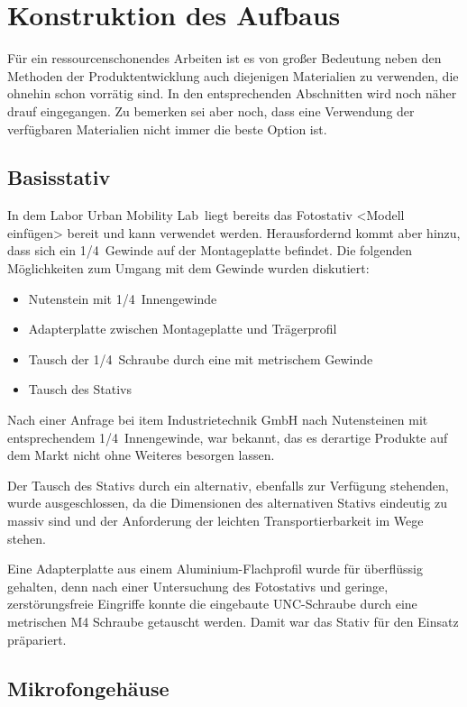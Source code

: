 \section{Konstruktion des Aufbaus}

Für ein ressourcenschonendes Arbeiten ist es von großer Bedeutung neben den Methoden der Produktentwicklung auch diejenigen Materialien zu verwenden, die ohnehin schon vorrätig sind. In den entsprechenden Abschnitten wird noch näher drauf eingegangen. Zu bemerken sei aber noch, dass eine Verwendung der verfügbaren Materialien nicht immer die beste Option ist.

\subsection{Basisstativ}

In dem Labor \glqq Urban Mobility Lab\grqq\ liegt bereits das Fotostativ <Modell einfügen> bereit und kann verwendet werden. Herausfordernd kommt aber hinzu, dass sich ein 1/4\grqq\ Gewinde auf der Montageplatte befindet. Die folgenden Möglichkeiten zum Umgang mit dem Gewinde wurden diskutiert:

\begin{itemize}
	\item Nutenstein mit 1/4\grqq\ Innengewinde
	\item Adapterplatte zwischen Montageplatte und Trägerprofil
	\item Tausch der 1/4\grqq\ Schraube durch eine mit metrischem Gewinde
	\item Tausch des Stativs
\end{itemize}

Nach einer Anfrage bei item Industrietechnik GmbH nach Nutensteinen mit entsprechendem 1/4\grqq\ Innengewinde, war bekannt, das es derartige Produkte auf dem Markt nicht ohne Weiteres besorgen lassen.

Der Tausch des Stativs durch ein alternativ, ebenfalls zur Verfügung stehenden, wurde ausgeschlossen, da die Dimensionen des alternativen Stativs eindeutig zu massiv sind und der Anforderung der leichten Transportierbarkeit im Wege stehen.

Eine Adapterplatte aus einem Aluminium-Flachprofil wurde für überflüssig gehalten, denn nach einer Untersuchung des Fotostativs und geringe, zerstörungsfreie Eingriffe konnte die eingebaute UNC-Schraube durch eine metrischen M4 Schraube getauscht werden. Damit war das Stativ für den Einsatz präpariert.

\subsection{Mikrofongehäuse}


